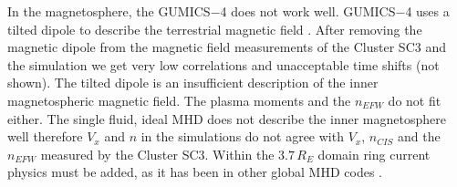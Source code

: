 \documentclass[b5paper,10pt]{article}
\begin{document}
In the magnetosphere, the GUMICS$-$4 does not work well. GUMICS$-$4 uses a tilted dipole to describe the terrestrial magnetic field \citep{janhunen12:_gumic_mhd}. After removing the magnetic dipole from the magnetic field measurements of the Cluster SC3 and the simulation we get very low correlations and unacceptable time shifts (not shown). The tilted dipole is an insufficient description of the inner magnetospheric magnetic field. The plasma moments and the $n_{EFW}$ do not fit either. The single fluid, ideal MHD does not describe the inner magnetosphere well therefore $V_{x}$ and $n$ in the simulations do not agree with $V_{x}$, $n_{CIS}$ and the $n_{EFW}$ measured by the Cluster SC3. Within the $3.7\,R_{E}$ domain ring current physics must be added, as it has been in other global MHD codes \citep[for example][]{toth12:_adapt}. %
\end{document}
